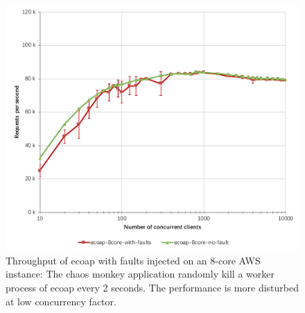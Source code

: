 \begin{figure}[!htbp]
\centering
\includegraphics[scale=0.65]{ecoap_faults_throughput}
\caption[Throughput of ecoap with faults injected on an 8-core AWS instance]{Throughput of ecoap with faults injected on an 8-core AWS instance: The chaos monkey application randomly kill a worker process of ecoap every 2 seconds. The performance is more disturbed at low concurrency factor.}
\label{fig:ecoap_faults_throughput}
\end{figure}

